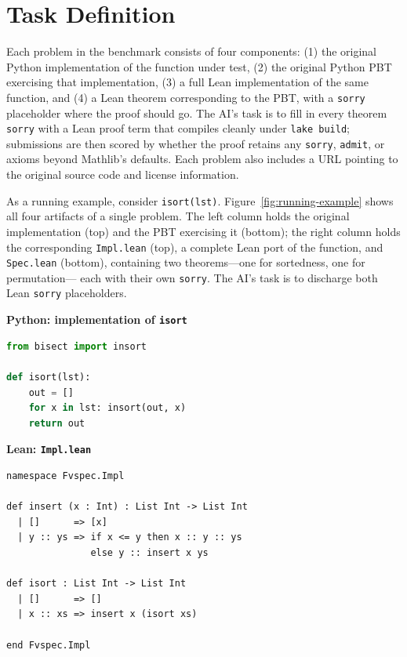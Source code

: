 \section{Task Definition}

Each problem in the \FVSpec benchmark consists of four components: (1) the original Python implementation of the function under test, (2) the original Python PBT exercising that implementation, (3) a full Lean implementation of the same function, and (4) a Lean theorem corresponding to the PBT, with a \texttt{sorry} placeholder where the proof should go. The AI's task is to fill in every theorem \texttt{sorry} with a Lean proof term that compiles cleanly under \texttt{lake build}; submissions are then scored by whether the proof retains any \texttt{sorry}, \texttt{admit}, or axioms beyond Mathlib's defaults. Each problem also includes a URL pointing to the original source code and license information.

As a running example, consider \texttt{isort(lst)}. Figure~\ref{fig:running-example}
shows all four artifacts of a single \FVSpec problem. The left column holds
the original implementation (top) and the PBT exercising it
(bottom); the right column holds the corresponding \texttt{Impl.lean}
(top), a complete Lean port of the function, and \texttt{Spec.lean}
(bottom), containing two theorems---one for sortedness, one for permutation---
each with their own \texttt{sorry}. The AI's task is to discharge both
Lean \texttt{sorry} placeholders.

\begin{lrbox}{\fvspecPyImplBox}%
\begin{minipage}{0.36\linewidth}
{\small\sffamily\textbf{Python: implementation of \texttt{isort}}}\par\smallskip
\begin{lstlisting}[style=code, language=Python, basicstyle=\ttfamily\scriptsize]
from bisect import insort

def isort(lst):
    out = []
    for x in lst: insort(out, x)
    return out
\end{lstlisting}
\end{minipage}%
\end{lrbox}%

\begin{lrbox}{\fvspecImplBox}%
\begin{minipage}{0.46\linewidth}
{\small\sffamily\textbf{Lean: \texttt{Impl.lean}}}\par\smallskip
\begin{lstlisting}[style=code, language=Lean, basicstyle=\ttfamily\scriptsize]
namespace Fvspec.Impl

def insert (x : Int) : List Int -> List Int
  | []      => [x]
  | y :: ys => if x <= y then x :: y :: ys
               else y :: insert x ys

def isort : List Int -> List Int
  | []      => []
  | x :: xs => insert x (isort xs)

end Fvspec.Impl
\end{lstlisting}
\end{minipage}%
\end{lrbox}%

